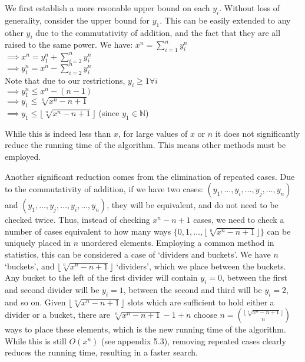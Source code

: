 \documentclass{article}
\begin{document}
\begin{flushleft}
We first establish a more resonable upper bound on each $y_i$. Without loss of generality, consider the upper bound for $y_1$. This can be easily extended to any other $y_i$ due to the commutativity of addition, and the fact that they are all raised to the same power. We have: $x^n = \sum^{n}_{i=1}y_i^n$ \\
\hspace{.15in} $\implies x^n = y_1^n + \sum_{i = 2}^ny_i^n$ \\
\hspace{.15in} $\implies y_1^n = x^n - \sum_{i = 2}^ny_i^n$ \\
Note that due to our restrictions, $y_i \geq 1 \forall i$ \\
\hspace{.15in} $\implies y_1^n \leq x^n - (n - 1)$ \\
\hspace{.15in} $\implies y_1 \leq \sqrt[n]{x^n - n + 1}$ \\
\hspace{.15in} $\implies y_1 \leq \lfloor\sqrt[n]{x^n - n + 1}\rfloor$ (since $y_1 \in \mathbb{N}$)

\vspace{.1in}

While this is indeed less than $x$, for large values of $x$ or $n$ it does not significantly reduce the running time of the algorithm. This means other methods must be employed.

\vspace{.1in}

Another significant reduction comes from the elimination of repeated cases. Due to the commutativity of addition, if we have two cases: $(y_1, \ldots, y_i, \ldots, y_j, \ldots, y_n)$ and $(y_1, \ldots, y_j, \ldots, y_i, \ldots, y_n)$, they will be equivalent, and do not need to be checked twice. Thus, instead of checking $x^n - n + 1$ cases, we need to check a number of cases equivalent to how many ways $\{0, 1, \ldots, \lfloor\sqrt[n]{x^n - n + 1}\rfloor\}$ can be uniquely placed in $n$ unordered elements. Employing a common method in statistics, this can be considered a case of `dividers and buckets'. We have $n$ `buckets', and $\lfloor\sqrt[n]{x^n - n + 1}\rfloor$ `dividers', which we place between the buckets. Any bucket to the left of the first divider will contain $y_i = 0$, between the first and second divider will be $y_i = 1$, between the second and third will be $y_i = 2$, and so on. Given $\lfloor\sqrt[n]{x^n - n + 1}\rfloor$ slots which are sufficient to hold either a divider or a bucket, there are $\sqrt[n]{x^n - n + 1} - 1 + n$ choose $n = {\lfloor\sqrt[n]{x^n - n + 1}\rfloor \choose n}$ ways to place these elements, which is the new running time of the algorithm. While this is still $O(x^n)$ (see appendix 5.3), removing repeated cases clearly reduces the running time, resulting in a faster search.


\end{flushleft}
\end{document}
